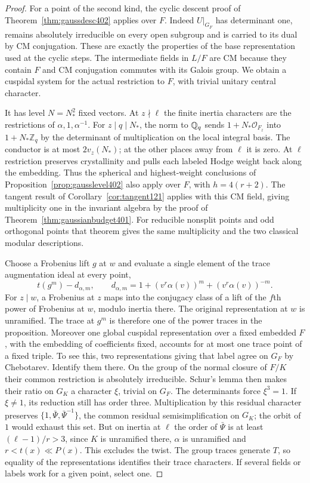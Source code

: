 \documentclass[a4paper,11pt]{article}
\theoremstyle{definition}
\theoremstyle{remark}
\newcommand{\ZZ}{\mathbb Z}\newcommand{\ord}{\operatorname{ord}}
\numberwithin{equation}{section}
\begin{document}
\begin{proof}
For a point of the second kind, the cyclic descent proof of
Theorem~\ref{thm:gaussdesc402} applies over \(F\). Indeed
\(U|_{G_F}\) has determinant one, remains absolutely irreducible
on every open subgroup and is carried to its dual by CM
conjugation. These are exactly the properties of the base
representation used at the cyclic steps. The intermediate
fields in \(L/F\) are CM because they contain \(F\) and CM
conjugation commutes with its Galois group. We obtain a
cuspidal system for the actual restriction to \(F\), with
trivial unitary central character.

It has level \(N=N_*^2\) fixed vectors. At \(z\nmid\ell\)
the finite inertia characters are the restrictions of
\(\alpha,1,\alpha^{-1}\). For \(z\mid q\mid N_*\), the norm
to \(\mathbb Q_q\) sends \(1+N_*\mathcal O_{F_z}\) into
\(1+N_*\ZZ_q\) by the determinant of multiplication on the
local integral basis. The conductor is at most \(2v_z(N_*)\);
at the other places away from \(\ell\) it is zero. At \(\ell\)
restriction preserves crystallinity and pulls each labeled Hodge
weight back along the embedding. Thus the spherical and
highest-weight conclusions of Proposition~\ref{prop:gausslevel402}
also apply over \(F\), with \(h=4(r+2)\). The tangent result
of Corollary~\ref{cor:tangent121} applies with this CM field,
giving multiplicity one in the invariant algebra by the proof
of Theorem~\ref{thm:gaussianbudget401}. For reducible nonsplit
points and odd orthogonal points that theorem gives the same
multiplicity and the two classical modular descriptions.

Choose a Frobenius lift \(g\) at \(w\) and evaluate a single
element of the trace augmentation ideal at every point,
\[
           t(g^m)-d_{\alpha,m},\qquad
 d_{\alpha,m}=1+(v^r\alpha(v))^m+(v^r\alpha(v))^{-m}.
\]
For \(z\mid w\), a Frobenius at \(z\) maps into the conjugacy
class of a lift of the \(f\)th power of Frobenius at \(w\),
modulo inertia there. The original representation at \(w\)
is unramified. The trace at \(g^m\) is therefore one of the
power traces in the proposition. Moreover one global cuspidal
representation over a fixed embedded \(F\), with the embedding
of coefficients fixed, accounts for at most one trace point
of a fixed triple. To see this, two representations giving
that label agree on \(G_F\) by Chebotarev. Identify them there.
On the group of the normal closure of \(F/K\) their common
restriction is absolutely irreducible. Schur's lemma then makes
their ratio on \(G_K\) a character \(\xi\), trivial on \(G_F\).
The determinants force \(\xi^3=1\). If \(\xi\ne1\), its reduction
still has order three. Multiplication by this residual
character preserves \(\{1,\bar\Psi,\bar\Psi^{-1}\}\), the common
residual semisimplification on \(G_K\); the orbit of \(1\)
would exhaust this set. But on inertia at \(\ell\) the order
of \(\bar\Psi\) is at least \((\ell-1)/r>3\), since \(K\) is
unramified there, \(\alpha\) is unramified and
\(r<t(x)\ll P(x)\). This excludes the twist. The group traces
generate \(T\), so equality of the representations identifies
their trace characters. If several fields or labels work for
a given point, select one.


\end{proof}
\end{document}
